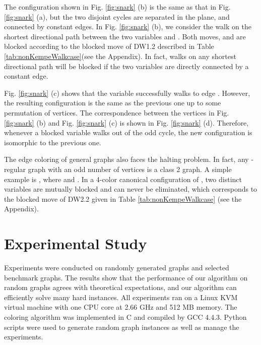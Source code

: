 \documentclass[11pt]{article}
\begin{document}
The configuration shown in Fig. \ref{fig:snark} (b) is the same as that in Fig. \ref{fig:snark} (a), but the two disjoint  cycles are separated in the plane, and connected by constant  edges. In Fig. \ref{fig:snark} (b), we consider the walk on the shortest directional path  between the two variables   and  . Both moves,  and  are blocked according to the blocked move of DW1.2 described in Table \ref{tab:nonKempeWalkcase}(see the Appendix). In fact, walks on any shortest directional path will be blocked if the two variables are directly connected by a constant  edge. 

Fig. \ref{fig:snark} (c) shows that the variable  successfully walks to edge . However, the resulting configuration is the same as the previous one up to some permutation of vertices. The correspondence between the vertices in Fig. \ref{fig:snark} (b) and Fig. \ref{fig:snark} (c) is shown in Fig. \ref{fig:snark} (d). Therefore, whenever a blocked variable walks out of the odd cycle, the new configuration is isomorphic to the previous one.



The edge coloring of general graphs also faces the halting problem. In fact, any -regular graph  with an odd number of vertices is a class 2 graph. A simple example is , where  and . In a 4-color canonical configuration of , two distinct variables are mutually blocked and can never be eliminated, which corresponds to the blocked move of DW2.2 given in Table \ref{tab:nonKempeWalkcase} (see the Appendix).


\section{Experimental Study}

Experiments were conducted on randomly generated graphs and selected benchmark graphs. The results show that the performance of our algorithm on random graphs agrees with theoretical expectations, and our algorithm can efficiently solve many hard instances. All experiments ran on a Linux KVM virtual machine with one CPU core at 2.66 GHz and 512 MB memory. The coloring algorithm was implemented in C and compiled by GCC 4.4.3. Python scripts were used to generate random graph instances as well as manage the experiments.
	
\end{document}
